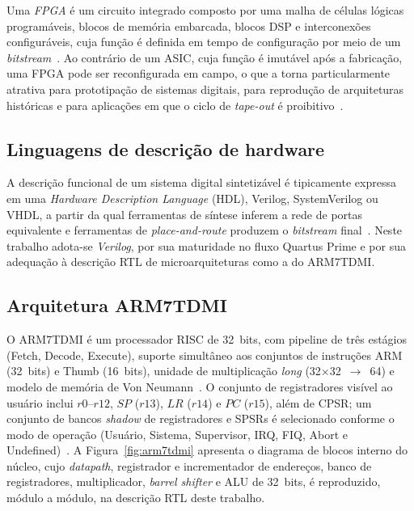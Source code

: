 \documentclass[pnumromarab,times]{politex}
\begin{document}
Uma \emph{FPGA} é um circuito integrado composto por uma malha de
células lógicas programáveis, blocos de memória embarcada, blocos
DSP e interconexões configuráveis, cuja função é definida em tempo
de configuração por meio de um \textit{bitstream}~\cite{HarrisHarris,
PattersonHennessy}. Ao contrário de um ASIC, cuja função é
imutável após a fabricação, uma FPGA pode ser reconfigurada em
campo, o que a torna particularmente atrativa para prototipação
de sistemas digitais, para reprodução de arquiteturas históricas e
para aplicações em que o ciclo de \textit{tape-out} é
proibitivo~\cite{Trimberger2015}.

\subsection{Linguagens de descrição de hardware}

A descrição funcional de um sistema digital sintetizável é
tipicamente expressa em uma \emph{Hardware Description Language}
(HDL), Verilog, SystemVerilog ou VHDL, a partir da qual
ferramentas de síntese inferem a rede de portas equivalente e
ferramentas de \emph{place-and-route} produzem o \textit{bitstream}
final~\cite{HarrisHarris}. Neste trabalho adota-se \emph{Verilog},
por sua maturidade no fluxo Quartus Prime e por sua adequação à
descrição RTL de microarquiteturas como a do ARM7TDMI.

\subsection{Arquitetura ARM7TDMI}

O ARM7TDMI é um processador RISC de 32~bits, com pipeline de três
estágios (Fetch, Decode, Execute), suporte simultâneo aos conjuntos
de instruções ARM (32~bits) e Thumb (16~bits), unidade de
multiplicação \emph{long} (32$\times$32~$\to$~64) e modelo de
memória de Von Neumann~\cite{ARM_DDI0210B,ARM_DVI0027B}. O conjunto
de registradores visível ao usuário inclui $r0$--$r12$, $SP$ ($r13$),
$LR$ ($r14$) e $PC$ ($r15$), além de CPSR; um conjunto de bancos
\textit{shadow} de registradores e SPSRs é selecionado conforme o
modo de operação (Usuário, Sistema, Supervisor, IRQ, FIQ, Abort e
Undefined)~\cite{ARM_DDI0210B}. A Figura~\ref{fig:arm7tdmi} apresenta o
diagrama de blocos interno do núcleo, cujo \textit{datapath},
registrador e incrementador de endereços, banco de registradores,
multiplicador, \textit{barrel shifter} e ALU de 32~bits, é reproduzido,
módulo a módulo, na descrição RTL deste trabalho.
\end{document}
